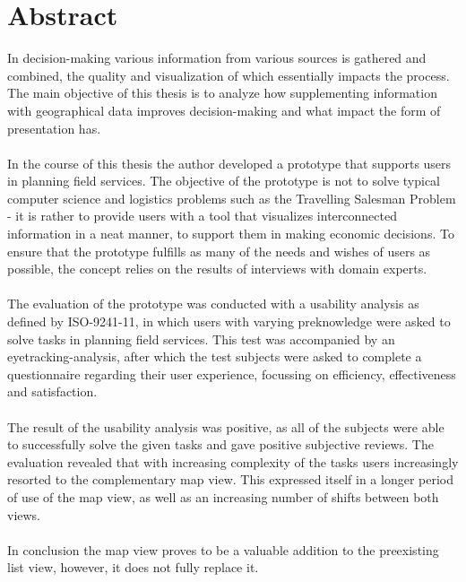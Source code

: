 \documentclass[Bachelorarbeit.tex]{subfiles}
\begin{document}
\chapter*{Abstract}
In decision-making various information from various sources is gathered and combined, the quality and visualization of which essentially impacts the process.
The main objective of this thesis is to analyze how supplementing information with geographical data improves decision-making and what impact the form of presentation has.
\\
\\
In the course of this thesis the author developed a prototype that supports users in planning field services. 
The objective of the prototype is not to solve typical computer science and logistics problems such as the Travelling Salesman Problem - it is rather to provide users with a tool that visualizes interconnected information in a neat manner, to support them in making economic decisions.
To ensure that the prototype fulfills as many of the needs and wishes of users as possible, the concept relies on the results of interviews with domain experts.
\\
\\
The evaluation of the prototype was conducted with a usability analysis as defined by ISO-9241-11, in which users with varying preknowledge were asked to solve tasks in planning field services.
This test was accompanied by an eyetracking-analysis, after which the test subjects were asked to complete a questionnaire regarding their user experience, focussing on efficiency, effectiveness and satisfaction.
\\
\\
The result of the usability analysis was positive, as all of the subjects were able to successfully solve the given tasks and gave positive subjective reviews.
The evaluation revealed that with increasing complexity of the tasks users increasingly resorted to the complementary map view.  
This expressed itself in a longer period of use of the map view, as well as an increasing number of shifts between both views.
\\
\\
In conclusion the map view proves to be a valuable addition to the preexisting list view, however, it does not fully replace it.
\end{document}

